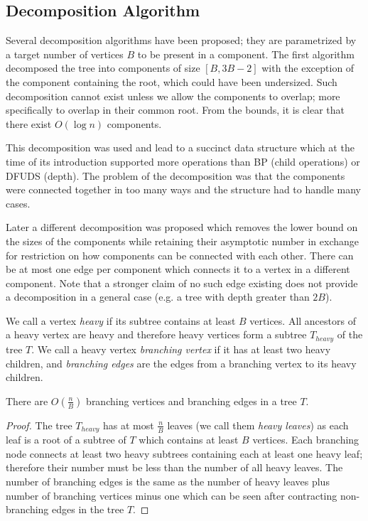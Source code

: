 \subsection{Decomposition Algorithm}

Several decomposition algorithms have been proposed; they are parametrized by a target number of vertices $B$ to be present in a component.
The first algorithm  decomposed the tree into components of size $[B, 3 B - 2]$ with the exception of the component containing the root, which could have been undersized.
Such decomposition cannot exist unless we allow the components to overlap; more specifically to overlap in their common root.
From the bounds, it is clear that there exist $O(\log n)$ components.

This decomposition was used and lead to a succinct data structure which at the time of its introduction supported more operations than BP (child operations) or DFUDS (depth).
The problem of the decomposition was that the components were connected together in too many ways and the structure had to handle many cases.

Later a different decomposition was proposed which removes the lower bound on the sizes of the components while retaining their asymptotic number in exchange for restriction on how components can be connected with each other.
There can be at most one edge per component which connects it to a vertex in a different component.
Note that a stronger claim of no such edge existing does not provide a decomposition in a general case (e.g. a tree with depth greater than $2 B$).

We call a vertex \emph{heavy} if its subtree contains at least $B$ vertices.
All ancestors of a heavy vertex are heavy and therefore heavy vertices form a subtree $T_{heavy}$ of the tree $T$.
We call a heavy vertex \emph{branching vertex} if it has at least two heavy children, and \emph{branching edges} are the edges from a branching vertex to its heavy children.

\begin{lemma}
	There are $O\left(\frac{n}{B}\right)$ branching vertices and branching edges in a tree $T$.
\end{lemma}
\begin{proof}
	The tree $T_{heavy}$ has at most $\frac{n}{B}$ leaves (we call them \emph{heavy leaves}) as each leaf is a root of a subtree of $T$ which contains at least $B$ vertices.
	Each branching node connects at least two heavy subtrees containing each at least one heavy leaf; therefore their number must be less than the number of all heavy leaves.
	The number of branching edges is the same as the number of heavy leaves plus number of branching vertices minus one which can be seen after contracting non-branching edges in the tree $T$.
\end{proof}


